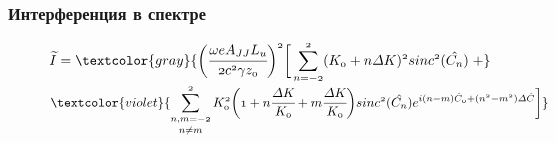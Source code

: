 \documentclass[14pt, hyperref = {colorlinks},xcolor=table ]{beamer}
\begin{document}
\small
\begin{frame}
\frametitle{Интерференция в спектре}\label{t1}
\vspace{-5pt}
\begin{figure}[h]
	\begin{minipage}[h]{0.49\linewidth}
		\vspace{-10pt}
	\end{minipage}	
	\begin{minipage}[h]{0.49\linewidth}
	\end{minipage}
\end{figure}
\vspace{-20pt}
\begin{figure}[h]
	$\mathnormal{{\widetilde{I}} =
	\textcolor{gray}{\bigg(\cfrac{\omega eA_{JJ}L_u}{2c^2 \gamma z_0}\bigg)^2\bigg[
	\displaystyle\sum\limits_{n =-2}^{2}(K_0 + n\Delta K)^2sinc^2(\hat{C_n}) \; + }}$\\
	
	$\textcolor{violet}{\mathnormal{\displaystyle\mathop{\sum\limits_{n, m =-2}^{2}}_{n \neq m}K^2_0\bigg(1 + n\cfrac{\Delta K}{K_0} + m\cfrac{\Delta K}{K_0}\bigg)
	sinc^2(\hat{C_n})e^{i(n-m)\hat{C}_0 + (n^2 - m^2)\Delta \hat{C}}\bigg]}}$
\end{figure}
\end{frame}
\end{document}
